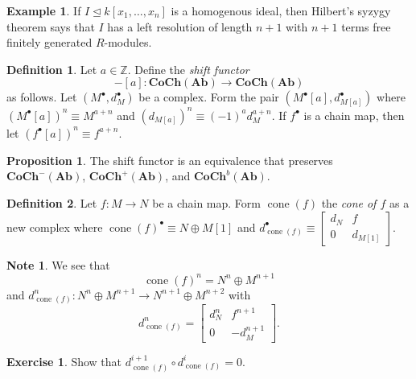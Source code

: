\documentclass[10pt,letterpaper,cm]{nupset}
\theoremstyle{definition}
\newtheorem*{definition}{Definition}
\newtheorem{exmp}{Example}
\newtheorem{note}{Note}
\newtheorem{prop}{Proposition}
\newtheorem{exercise}{Exercise}
\newcommand{\Z}{\mathbb Z}
\newcommand{\1}{\mathbf{1}}
\newcommand{\0}{\vec 0}
\DeclareMathOperator{\cone}{cone}
\begin{document}
\begin{exmp}
If $I \unlhd k[x_1, \ldots, x_n]$ is a homogenous ideal, then Hilbert's syzygy theorem says that $I$ has a left resolution of length $n+1$ with $n+1$ terms free finitely generated $R$-modules.
\end{exmp}

\begin{definition}
Let $a\in \Z$. Define the \textit{shift functor} $${-}[a] : \mathbf{CoCh}(\mathbf{Ab}) \to \mathbf{CoCh}(\mathbf{Ab})$$ as follows. Let $(M^{\bullet}, d^{\bullet}_{M})$ be a complex.  Form the pair $(M^{\bullet}[a], d^{\bullet}_{M[a]})$ where $(M^{\bullet}[a])^n \equiv M^{a+n}$ and $(d_{M[a]})^n \equiv ({-}1)^a d^{a+n}_M$. If $f^{\bullet}$ is a chain map, then let $(f^{\bullet}[a])^n \equiv f^{a+n}$.
\end{definition}

\begin{prop}
The shift functor  is an equivalence that preserves $\mathbf{CoCh}^{{-}}(\mathbf{Ab})$, $\mathbf{CoCh}^{+}(\mathbf{Ab})$, and $\mathbf{CoCh}^{b}(\mathbf{Ab})$.
\end{prop}

\begin{definition}
Let $f: M \to N$ be a chain map. Form  $\cone(f)$ the \textit{cone of $f$} as a new complex where $\cone(f)^{\bullet} \equiv N \oplus M[1]$ and $d_{\cone(f)}^{\bullet} \equiv \begin{bmatrix}  d_N & f \\ 0 & d_{M[1]}    \end{bmatrix}.$
\end{definition}

\begin{note}
We see that $$\cone(f)^n = N^n \oplus M^{n+1}$$ and $d^n_{\cone(f)} : N^n \oplus M^{n+1} \to N^{n+1} \oplus M^{n+2}$ with $$d^n_{\cone(f)}  = \begin{bmatrix}  d_N^n & f^{n+1} \\ 0 & {-}d_M^{n+1}  \end{bmatrix}.$$
\end{note}

\begin{exercise}
Show that $d^{i+1}_{\cone(f)} \circ d^i_{\cone(f)} =0$.
\end{exercise}
\end{document}
